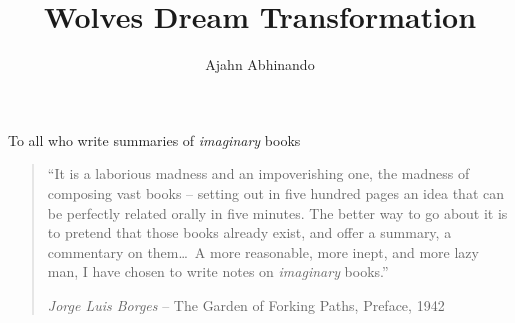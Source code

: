 \documentclass[11pt,twoside,final]{memoir}
\title{Wolves Dream Transformation}
\subtitle{}
\author{Ajahn Abhinando}
\date{}
\begin{document}
\emptysheet


\frontmatter*


\cleartoverso
\thispagestyle{empty}



\cleartorecto
\thispagestyle{empty}



\cleartoverso
\thispagestyle{empty}



\cleartorecto
\thispagestyle{empty}
{\raggedleft\vspace*{5em}\par
To all who write summaries of \emph{imaginary} books
\par}


\cleartorecto
\tableofcontents*



\cleartorecto
\thispagestyle{empty}
{\raggedleft\vspace*{5em}

\begin{minipage}{0.9\linewidth}

\begin{quote}
``It is a laborious madness and an impoverishing one, the madness of composing vast books -- setting out in five hundred pages an idea that can be perfectly related orally in five minutes. The better way to go about it is to pretend that those books already exist, and offer a summary, a commentary on them\ldots\ A more reasonable, more inept, and more lazy man, I have chosen to write notes on \emph{imaginary} books.''

{\small\textit{Jorge Luis Borges} -- The Garden of Forking Paths, Preface, 1942}
\end{quote}

\end{minipage}

}
\end{document}
